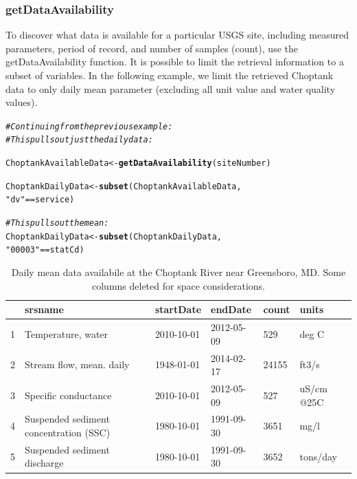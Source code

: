 \documentclass[a4paper,11pt]{article}\usepackage[]{graphicx}\usepackage[]{color}
\makeatletter
\newcommand{\hlstr}[1]{\textcolor[rgb]{0.192,0.494,0.8}{#1}}%
\newcommand{\hlcom}[1]{\textcolor[rgb]{0.678,0.584,0.686}{\textit{#1}}}%
\newcommand{\hlopt}[1]{\textcolor[rgb]{0,0,0}{#1}}%
\newcommand{\hlstd}[1]{\textcolor[rgb]{0.345,0.345,0.345}{#1}}%
\newcommand{\hlkwb}[1]{\textcolor[rgb]{0.69,0.353,0.396}{#1}}%
\newcommand{\hlkwd}[1]{\textcolor[rgb]{0.737,0.353,0.396}{\textbf{#1}}}%
\newenvironment{kframe}{%
 \def\at@end@of@kframe{}%
 \ifinner\ifhmode%
  \def\at@end@of@kframe{\end{minipage}}%
  \begin{minipage}{\columnwidth}%
 \fi\fi%
 \def\FrameCommand##1{\hskip\@totalleftmargin \hskip-\fboxsep
 \colorbox{shadecolor}{##1}\hskip-\fboxsep
     \hskip-\linewidth \hskip-\@totalleftmargin \hskip\columnwidth}%
 \MakeFramed {\advance\hsize-\width
   \@totalleftmargin\z@ \linewidth\hsize
   \@setminipage}}%
 {\par\unskip\endMakeFramed%
 \at@end@of@kframe}
\newenvironment{knitrout}{}{} %
\makeatother
\begin{document}
\subsubsection{getDataAvailability}
\label{sec:usgsDataAvailability}
To discover what data is available for a particular USGS site, including measured parameters, period of record, and number of samples (count), use the getDataAvailability function. It is possible to limit the retrieval information to a subset of variables. In the following example, we limit the retrieved Choptank data to only daily mean parameter (excluding all unit value and water quality values).


\begin{knitrout}
\color{fgcolor}\begin{kframe}
\begin{alltt}
\hlcom{# Continuing from the previous example:}
\hlcom{# This pulls out just the daily data:}

\hlstd{ChoptankAvailableData} \hlkwb{<-} \hlkwd{getDataAvailability}\hlstd{(siteNumber)}

\hlstd{ChoptankDailyData} \hlkwb{<-} \hlkwd{subset}\hlstd{(ChoptankAvailableData,}
                            \hlstr{"dv"} \hlopt{==} \hlstd{service)}

\hlcom{# This pulls out the mean:}
\hlstd{ChoptankDailyData} \hlkwb{<-} \hlkwd{subset}\hlstd{(ChoptankDailyData,}
                            \hlstr{"00003"} \hlopt{==} \hlstd{statCd)}
\end{alltt}
\end{kframe}
\end{knitrout}


\begin{table}[ht]
\centering
\begin{tabular}{rlllll}
  \hline
 & srsname & startDate & endDate & count & units \\ 
  \hline
1 & Temperature, water & 2010-10-01 & 2012-05-09 & 529 & deg C \\ 
  2 & Stream flow, mean. daily & 1948-01-01 & 2014-02-17 & 24155 & ft3/s \\ 
  3 & Specific conductance & 2010-10-01 & 2012-05-09 & 527 & uS/cm @25C \\ 
  4 & Suspended sediment concentration (SSC) & 1980-10-01 & 1991-09-30 & 3651 & mg/l \\ 
  5 & Suspended sediment discharge & 1980-10-01 & 1991-09-30 & 3652 & tons/day \\ 
   \hline
\end{tabular}
\caption{Daily mean data availabile at the Choptank River near Greensboro, MD. Some columns deleted for space considerations.} 
\label{tab:gda}
\end{table}
\end{document}
